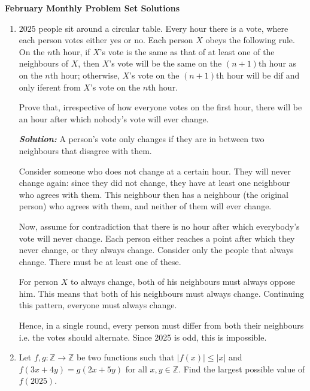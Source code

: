 \documentclass[11pt]{article}
\newcommand{\sol}{\textbf{\textit{Solution: }}}
\begin{document}
\begin{center} \bfseries \large
    February Monthly Problem Set Solutions

\end{center}


\begin{enumerate}[topsep=\bigskipamount,itemsep=\bigskipamount,leftmargin=0pt]
\item %
$2025$ people sit around a circular table.
Every hour there is a vote, where each person votes either yes or no.
Each person $X$ obeys the following rule.
On the $n$th hour, if $X$'s vote is the same as that of at least one of the neighbours of $X$, then $X$'s vote will be the same on the $(n+1)$th hour as on the $n$th hour; otherwise, $X$'s vote on the $(n+1)$th hour will be dif and only iferent from $X$'s vote on the $n$th hour.

Prove that, irrespective of how everyone votes on the first hour, there will be an hour after which nobody's vote will ever change.

\sol %
A person's vote only changes if they are in between two neighbours that disagree with them.

Consider someone who does not change at a certain hour. They will never change again: since they did not change, they have at least one neighbour who agrees with them. This neighbour then has a neighbour (the original person) who agrees with them, and neither of them will ever change.

Now, assume for contradiction that there is no hour after which everybody's vote will never change. Each person either reaches a point after which they never change, or they always change. Consider only the people that always change. There must be at least one of these.

For person $X$ to always change, both of his neighbours must always oppose him. This means that both of his neighbours must always change. Continuing this pattern, everyone must always change.

Hence, in a single round, every person must differ from both their neighbours i.e. the votes should alternate. Since 2025 is odd, this is impossible.

\item %
Let $f,g : \mathbb{Z} \to \mathbb{Z}$ be two functions such that $|f(x)| \leqslant |x|$ and $f(3x+4y) = g(2x+5y)$ for all $x,y \in \mathbb{Z}$.
Find the largest possible value of $f(2025)$.


\end{enumerate}
\end{document}
